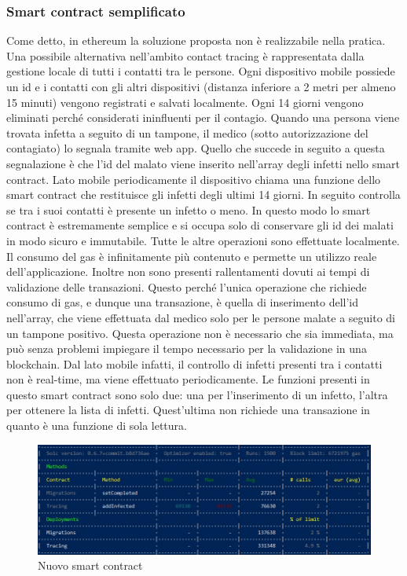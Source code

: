 \subsubsection{Smart contract semplificato}
Come detto, in ethereum la soluzione proposta non è realizzabile nella pratica. Una possibile alternativa nell’ambito contact tracing è rappresentata dalla gestione locale di tutti i contatti tra le persone. Ogni dispositivo mobile possiede un id e i contatti con gli altri dispositivi (distanza inferiore a 2 metri per almeno 15 minuti) vengono registrati e salvati localmente. Ogni 14 giorni vengono eliminati perché considerati ininfluenti per il contagio.
Quando una persona viene trovata infetta a seguito di un tampone, il medico (sotto autorizzazione del contagiato) lo segnala tramite web app. Quello che succede in seguito a questa segnalazione è che l’id del malato viene inserito nell’array degli infetti nello smart contract. 
Lato mobile periodicamente il dispositivo chiama una funzione dello smart contract che restituisce gli infetti degli ultimi 14 giorni. In seguito controlla se tra i suoi contatti è presente un infetto o meno.
In questo modo lo smart contract è estremamente semplice e si occupa solo di conservare gli id dei malati in modo sicuro e immutabile.
Tutte le altre operazioni sono effettuate localmente. Il consumo del gas è infinitamente più contenuto e permette un utilizzo reale dell’applicazione. Inoltre non sono presenti rallentamenti dovuti ai tempi di validazione delle transazioni. Questo perché l’unica operazione che richiede consumo di gas, e dunque una transazione, è quella di inserimento dell’id nell’array, che viene effettuata dal medico solo per le persone malate a seguito di un tampone positivo. Questa operazione non è necessario che sia immediata, ma può senza problemi impiegare il tempo necessario per la validazione in una blockchain. Dal lato mobile infatti, il controllo di infetti presenti tra i contatti non è real-time, ma viene effettuato periodicamente.
Le funzioni presenti in questo smart contract sono solo due: una per l’inserimento di un infetto, l’altra per ottenere la lista di infetti. Quest’ultima non richiede una transazione in quanto è una funzione di sola lettura.\\

\begin{figure}[h]
\caption{Nuovo smart contract}
\centering
\includegraphics[width=1.0\textwidth]{./immagini/costiOnlyInfected}
\end{figure}

